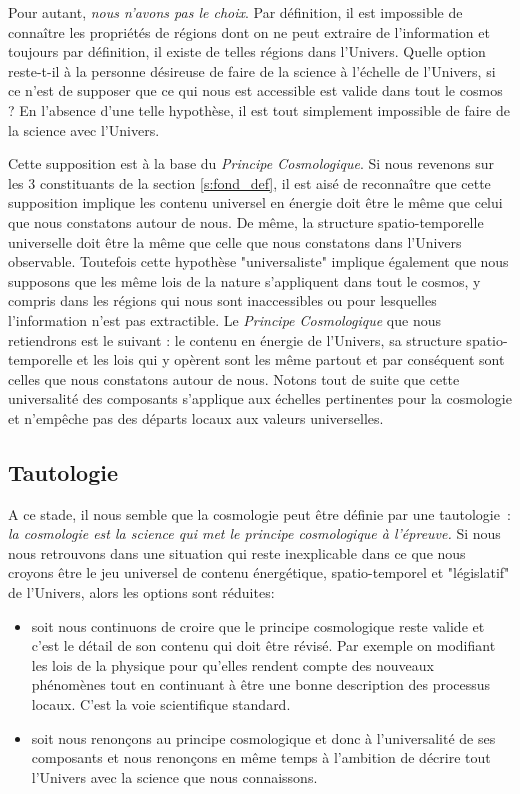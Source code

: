 Pour autant, \textit{nous n'avons pas le choix}. Par définition, il est impossible de connaître les propriétés de régions dont on ne peut extraire de l'information et toujours par définition, il existe de telles régions dans l'Univers. Quelle option reste-t-il à la personne désireuse de faire de la science à l'échelle de l'Univers, si ce n'est de supposer que ce qui nous est accessible est valide dans tout le cosmos ? En l'absence d'une telle hypothèse, il est tout simplement impossible de faire de la science avec l'Univers.

Cette supposition est à la base du \textit{Principe Cosmologique}. Si nous revenons sur les 3 constituants de la section \ref{s:fond_def}, il est aisé de reconnaître que cette supposition implique les contenu universel en énergie doit être le même que celui que nous constatons autour de nous. De même, la structure spatio-temporelle universelle doit être la même que celle que nous constatons dans l'Univers observable. Toutefois cette hypothèse "universaliste" implique également que nous supposons que les même lois de la nature s'appliquent dans tout le cosmos, y compris dans les régions qui nous sont inaccessibles ou pour lesquelles l'information n'est pas extractible. Le \textit{Principe Cosmologique} que nous retiendrons est le suivant : le contenu en énergie de l'Univers, sa structure spatio-temporelle et les lois qui y opèrent sont les même partout et par conséquent sont celles que nous constatons autour de nous. Notons tout de suite que cette universalité des composants s'applique aux échelles pertinentes pour la cosmologie et n'empêche pas des départs locaux aux valeurs universelles.

\subsection{Tautologie}

A ce stade, il nous semble que la cosmologie peut être définie par une tautologie~: \textit{la cosmologie est la science qui met le principe cosmologique à l'épreuve.} Si nous nous retrouvons dans une situation qui reste inexplicable dans ce que nous croyons être le jeu universel de contenu énergétique, spatio-temporel et "législatif" de l'Univers, alors les options sont réduites:
\begin{itemize}
\item soit nous continuons de croire que le principe cosmologique reste valide et c'est le détail de son contenu qui doit être révisé. Par exemple on modifiant les lois de la physique pour qu'elles rendent compte des nouveaux phénomènes tout en continuant à être une bonne description des processus locaux. C'est la voie scientifique standard.
\item soit nous renonçons au principe cosmologique et donc à l'universalité de ses composants et nous renonçons en même temps à l'ambition de décrire tout l'Univers avec la science que nous connaissons.
\end{itemize}

